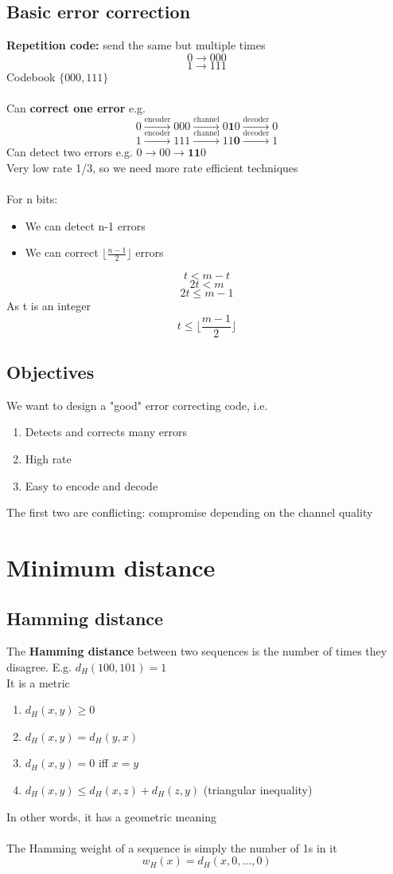 \documentclass{article}[18pt]
\begin{document}
\subsection{Basic error correction}
\textbf{Repetition code:} send the same but multiple times
$$0\rightarrow 000$$
$$1\rightarrow 111$$
Codebook $\{000,111\}$\\
\\
Can \textbf{correct one error} e.g.
$$0\xrightarrow{\text{encoder}}000\xrightarrow{\text{channel}}0\mathbf{1}0\xrightarrow{\text{decoder}}0$$
$$1\xrightarrow{\text{encoder}}111\xrightarrow{\text{channel}}11\mathbf{0}\xrightarrow{\text{decoder}}1$$
Can detect two errors e.g. $0\rightarrow 00 \rightarrow \mathbf{11}0$\\
Very low rate 1/3, so we need more rate efficient techniques\\
\\
For n bits:
\begin{itemize}
	\item We can detect n-1 errors
	\item We can correct $\lfloor \frac{n-1}{2}\rfloor$ errors
\end{itemize}
$$t<m-t$$
$$2t<m$$
$$2t\leqslant m-1$$
As t is an integer
$$t\leqslant\Bigg\lfloor \frac{m-1}{2}\Bigg\rfloor$$
\subsection{Objectives}
We want to design a "good" error correcting code, i.e.
\begin{enumerate}
	\item Detects and corrects many errors
	\item High rate
	\item Easy to encode and decode
\end{enumerate}
The first two are conflicting: compromise depending on the channel quality
\section{Minimum distance}
\subsection{Hamming distance}
The \textbf{Hamming distance} between two sequences is the number of times they disagree. E.g. $d_H(100,101)=1$\\
It is a metric
\begin{enumerate}
	\item $d_H(x,y)\geqslant 0$
	\item $d_H(x,y)=d_H(y,x)$
	\item $d_H(x,y)=0$ iff $x=y$
	\item $d_H(x,y)\leqslant d_H(x,z)+d_H(z,y)$ (triangular inequality)
\end{enumerate}
In other words, it has a geometric meaning\\
\\
The Hamming weight of a sequence is simply the number of 1s in it
$$w_H(x)=d_H(x,0,...,0)$$
\end{document}

